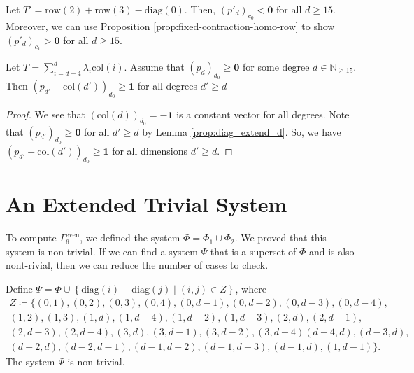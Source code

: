   
  
\begin{example}
    Let \( T' = \mathrm{row}(2) + \mathrm{row}(3) - \mathrm{diag}(0) \).
    Then, \( (p'_d)_{c_0} < \mathbf{0} \) for all \( d \geq 15 \). Moreover, we can use Proposition \ref{prop:fixed-contraction-homo-row} to show \( (p'_d)_{c_1} > \mathbf{0} \) for all \( d \geq 15 \).
  \end{example}

\begin{proposition}\label{prop:col_homo_d_zero_diag}
Let \( T = \sum_{i=d-4}^d \lambda_i \mathrm{col}(i)\). Assume that \( (p_d)_{d_0} \geq \mathbf{0} \) for some degree \( d \in \mathbb{N}_{\geq 15} \). Then \( (p_{d'} - \mathrm{col}(d'))_{d_0} \geq \mathbf 1 \) for all degrees \( d' \geq d \)
\end{proposition}
  
\begin{proof}
We see that \( (\mathrm{col}(d))_{d_0} = -\mathbf 1 \) is a constant vector for all degrees. Note that \( (p_{d'})_{d_0} \geq \mathbf 0 \) for all \( d' \geq d \) by Lemma \ref{prop:diag_extend_d}. So, we have \( (p_{d'} - \mathrm{col}(d'))_{d_0} \geq \mathbf 1 \) for all dimensions \( d' \geq d \).
\end{proof}
  



\section{An Extended Trivial System}

To compute \(  \Gamma^{\mathrm{even}}_6 \), we defined the system \( \Phi = \Phi_1 \cup \Phi_2 \). We proved that this system is non-trivial. If we can find a system \( \Psi \) that is a superset of \( \Phi \) and is also nont-rivial, then we can reduce the number of cases to check. 

\begin{proposition}
    Define \( \Psi = \Phi \cup \left\{ \mathrm{diag}(i) - \mathrm{diag}(j) \mid (i,j) \in Z \right\} \), where 
    \begin{gather*}
        Z \coloneqq \{ (0,1), (0,2), (0,3), (0,4), (0,d-1), (0,d-2), (0,d-3), (0,d-4),\\ (1,2), (1,3), (1, d), (1,d-4), (1,d-2), (1,d-3), (2,d), (2,d-1),\\ (2,d-3), (2, d-4), (3,d), (3,d-1), (3,d-2), (3, d-4)
        (d-4,d), (d-3,d),\\ (d-2,d), (d-2,d-1), (d-1,d-2), (d-1,d-3), (d-1,d), (1, d-1)\}.
    \end{gather*}
    The system \( \Psi \) is non-trivial.
\end{proposition}

